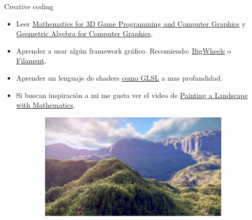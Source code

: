\begin{frame}{Creative coding}
\begin{itemize}
    \item Leer \href{https://www.amazon.com/Mathematics-Programming-Computer-Graphics-Third/dp/1435458869}{Mathematics for 3D Game Programming and Computer Graphics} y \href{https://link.springer.com/book/10.1007/978-1-84628-997-2}{Geometric Algebra for Computer Graphics}.
    \item Aprender a usar algún framework gráfico. Recomiendo: \href{https://github.com/google/bigwheels}{BigWheels} o \href{https://github.com/google/filament}{Filament}.
    \item Aprender un lenguaje de shaders \href{https://www.amazon.com/OpenGL-Shading-Language-Cookbook-high-quality/dp/1789342252/}{como GLSL} a mas profundidad.
    \item Si buscan inspiración a mi me gusta ver el video de \href{https://www.youtube.com/watch?v=BFld4EBO2RE}{Painting a Landscape with Mathematics}.
\end{itemize}
\begin{figure}[htp]
 \centering
 \begin{subfigure}[b]{0.3\textwidth}
   \includegraphics[width=\textwidth]{img/RainForest}
 \end{subfigure}
~
 \begin{subfigure}[b]{0.12\textwidth}

\end{subfigure}
\end{figure}
\end{frame}
